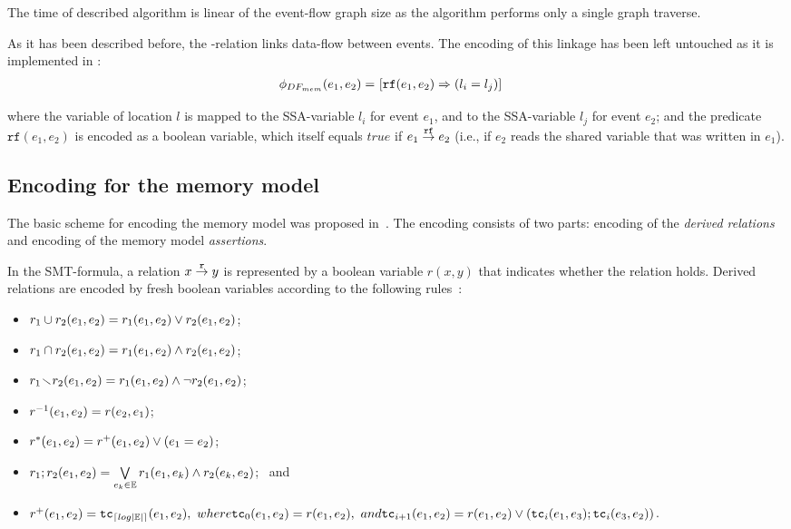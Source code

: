 The time of described algorithm is linear of the event-flow graph size as the algorithm performs only a single graph traverse.

As it has been described before, the \rf-relation links data-flow between events.
The encoding of this linkage has been left untouched as it is implemented in \porthos[1]: %
%
\begin{align}
\phi_{DF_{mem}}(e_1, e_2) = \ & [\texttt{rf}(e_1, e_2) \Rightarrow (l_i = l_j)]
\end{align}

where the variable of location $l$ is mapped to the SSA-variable $l_i$ for event $e_1$, and to the SSA-variable $l_j$ for event $e_2$; and the predicate $\texttt{rf}(e_1, e_2)$ is encoded as a boolean variable, which itself equals $\textit{true}$ if $e_1 \overset{\texttt{rf}}{\rightarrow} e_2$ (i.e., if $e_2$ reads the shared variable that was written in $e_1$).


\subsection{Encoding for the memory model}
\label{ch:enc:bmc:wmm}

The basic scheme for encoding the memory model was proposed in~\cite{Porthos17a}.
The encoding consists of two parts: encoding of the \textit{derived relations} and encoding of the memory model \textit{assertions}.

In the SMT-formula, a relation $x \overset{\texttt{r}}{\rightarrow} y$ is represented by a boolean variable $r(x, y)$ that indicates whether the relation holds.
Derived relations are encoded by fresh boolean variables according to the following rules~\cite{Porthos17b}:
\begin{itemize}[noitemsep,topsep=0pt]
\item $r_1 \cup r_2(e_1, e_2) = r_1(e_1, e_2) \lor r_2(e_1, e_2)$;
\item $r_1 \cap r_2(e_1, e_2) = r_1(e_1, e_2) \land r_2(e_1, e_2)$;
\item $r_1 \!\smallsetminus\! r_2(e_1, e_2) = r_1(e_1, e_2) \land \neg r_2(e_1, e_2)$;
\item $r^{-1}(e_1, e_2) = r(e_2, e_1)$;
\item $r^{*}(e_1, e_2) = r^{+}(e_1, e_2) \lor (e_1 = e_2)$;
\item $r_1;r_2(e_1,e_2) = \bigvee\limits_{e_k \in \mathbb{E}}^{} r_1(e_1,e_k) \land r_2(e_k,e_2)$; \ and
\item $r^{+}(e_1, e_2) \defeq \texttt{tc}_{\left\lceil log|\mathbb{E}| \right\rceil} (e_1, e_2), \ where \vspace{0.25em} \\
\texttt{tc}_{0}(e_1,e_2) \defeq r(e_1,e_2), \ and \\
\texttt{tc}_{i+1}(e_1,e_2) \defeq r(e_1,e_2) \lor (\texttt{tc}_{i}(e_1,e_3);\texttt{tc}_{i}(e_3,e_2))$.
\end{itemize}
\vspace{1em}

